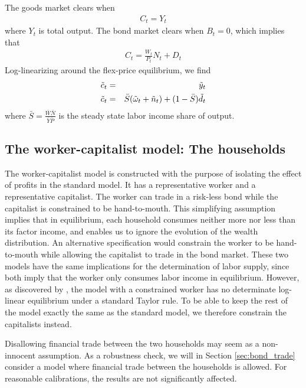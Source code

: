 The goods market clears when
\begin{eqnarray}
C_t = Y_t \nonumber
\end{eqnarray}
where $Y_t$ is total output. The bond market clears when $B_t=0$, which implies that
\begin{eqnarray}
C_t = \frac{W_t}{P_t}N_t+D_t \nonumber
\end{eqnarray}
Log-linearizing around the flex-price equilibrium, we find 
\begin{eqnarray}
\lb{std_mcgoods_log}
\tilde c_t &=& \tilde y_t \\
\lb{std_mcbonds_log}
\tilde c_t &=& \bar S (\tilde \omega_t+\tilde n_t) + (1-\bar S)\tilde d_t
\end{eqnarray}
where $\bar S=\frac{\bar W \bar N}{\bar Y \bar P}$ is the steady state labor income share of output.


\subsection{The worker-capitalist model: The households}
The worker-capitalist model is constructed with the purpose of isolating the effect of profits in the standard model. It has a representative worker and a representative capitalist. The worker can trade in a risk-less bond while the capitalist is constrained to be hand-to-mouth. This simplifying assumption implies that in equilibrium, each household consumes neither more nor less than its factor income, and enables us to ignore the evolution of the wealth distribution. An alternative specification would constrain the worker to be hand-to-mouth while allowing the capitalist to trade in the bond market. These two models have the same implications for the determination of labor supply, since both imply that the worker only consumes labor income in equilibrium. However, as discovered by  \citet{Bilbiie2008}, the model with a constrained worker has no determinate log-linear equilibrium under a standard Taylor rule. To be able to keep the rest of the model exactly the same as the standard model, we therefore constrain the capitalists instead.  

Disallowing financial trade between the two households may seem as a non-innocent assumption. As a robustness check, we will in Section \ref{sec:bond_trade} consider a model where financial trade between the households is allowed. For reasonable calibrations, the results are not significantly affected.


